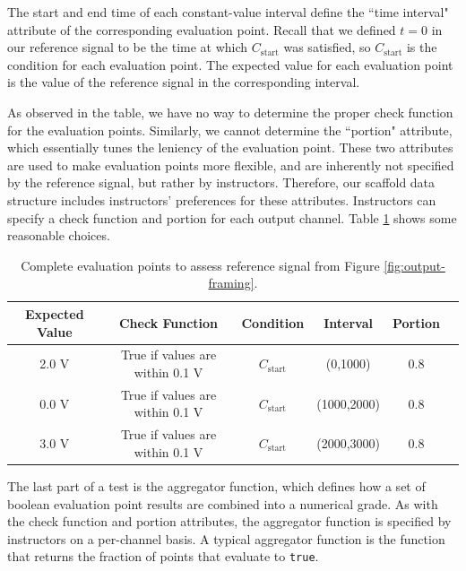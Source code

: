 \documentclass[12pt]{article}
\begin{document}
The start and end time of each constant-value interval define the ``time interval" attribute of the corresponding evaluation point.  Recall that we defined $t=0$ in our reference signal to be the time at which $C_{\text{start}}$ was satisfied, so $C_{\text{start}}$ is the condition for each evaluation point.  The expected value for each evaluation point is the value of the reference signal in the corresponding interval.

As observed in the table, we have no way to determine the proper check function for the evaluation points.  Similarly, we cannot determine the ``portion" attribute, which essentially tunes the leniency of the evaluation point.  These two attributes are used to make evaluation points more flexible, and are inherently not specified by the reference signal, but rather by instructors.  Therefore, our scaffold data structure includes instructors' preferences for these attributes.  Instructors can specify a check function and portion for each output channel.  Table \ref{table:construct-points-2} shows some reasonable choices.

\begin{table}[ht]
\begin{center}
\caption{Complete evaluation points to assess reference signal from Figure \ref{fig:output-framing}.}
\vspace{2mm}
\label{table:construct-points-2}
\begin{tabular}{cccccc}
Expected Value & Check Function & Condition & Interval & Portion \\ \hline
2.0 V & True if values are within 0.1 V & $C_{\text{start}}$ & (0,1000) & 0.8 \\
0.0 V & True if values are within 0.1 V & $C_{\text{start}}$ & (1000,2000) & 0.8 \\
3.0 V & True if values are within 0.1 V & $C_{\text{start}}$ & (2000,3000) & 0.8 \\ \hline
\end{tabular}
\end{center}
\end{table}

The last part of a test is the aggregator function, which defines how a set of boolean evaluation point results are combined into a numerical grade.  As with the check function and portion attributes, the aggregator function is specified by instructors on a per-channel basis.  A typical aggregator function is the function that returns the fraction of points that evaluate to \texttt{true}.
\end{document}
